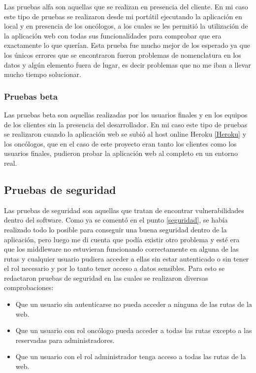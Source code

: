 Las pruebas alfa son aquellas que se realizan en presencia del cliente. En mi caso este tipo de pruebas se realizaron desde mi portátil ejecutando la aplicación en local y en presencia de los oncólogos, a los cuales se les permitió la utilización de la aplicación web con todas sus funcionalidades para comprobar que era exactamente lo que querían. Esta prueba fue mucho mejor de los esperado ya que los únicos errores que se encontraron fueron problemas de nomenclatura en los datos y algún elemento fuera de lugar, es decir problemas que no me iban a llevar mucho tiempo solucionar.

\subsubsection{Pruebas beta}

Las pruebas beta son aquellas realizadas por los usuarios finales y en los equipos de los clientes sin la presencia del desarrollador. En mi caso este tipo de pruebas se realizaron cuando la aplicación web se subió al host online Heroku \ref{Heroku} y los oncólogos, que en el caso de este proyecto eran tanto los clientes como los usuarios finales, pudieron probar la aplicación web al completo en un entorno real.

\subsection{Pruebas de seguridad}

Las pruebas de seguridad son aquellas que tratan de encontrar vulnerabilidades dentro del software. Como ya se comentó en el punto \ref{seguridad}, se había realizado todo lo posible para conseguir una buena seguridad dentro de la aplicación, pero luego me di cuenta que podía existir otro problema y esté era que los middleware no estuvieran funcionando correctamente en alguna de las rutas y cualquier usuario pudiera acceder a ellas sin estar autenticado o sin tener el rol necesario y por lo tanto tener acceso a datos sensibles. Para esto se redactaron pruebas de seguridad en las cuales se realizaron diversas comprobaciones:
\begin{itemize}
    \item Que un usuario sin autenticarse no pueda acceder a ninguna de las rutas de la web.
    \item Que un usuario con rol oncólogo pueda acceder a todas las rutas excepto a las reservadas para administradores.
    \item Que un usuario con el rol administrador tenga acceso a todas las rutas de la web.
\end{itemize}

